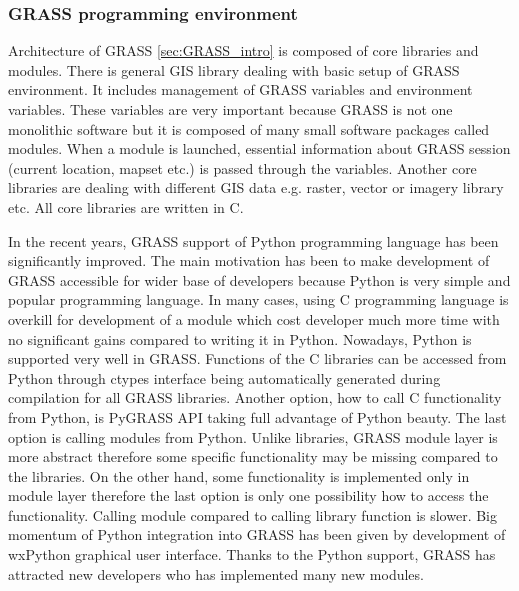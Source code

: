 \documentclass[a4paper,12pt]{article}
\begin{document}
\subsubsection{GRASS programming  environment}




Architecture of GRASS \ref{sec:GRASS_intro} is composed of core libraries and modules. There is general GIS library 
dealing with basic setup of GRASS environment. It includes management of
GRASS variables and environment variables. These variables are very important because GRASS is not one monolithic software 
but it is composed of many small software packages called modules. When a module is launched, essential information 
about GRASS session (current location, mapset etc.) is passed through the variables. 
Another core libraries are dealing with different GIS data e.g. raster, vector or imagery library etc. 
All core libraries are written in C. 

In the recent years, GRASS support of Python programming language has been significantly 
improved. The main motivation has been to make development of GRASS accessible for wider base
of developers because Python is very simple and popular programming language. 
In many cases, using 
C programming language is overkill for development of a module which cost developer much more time 
with no significant gains compared to writing it in Python. Nowadays, Python is supported very well in GRASS.
Functions of the C libraries can be accessed from Python through ctypes interface being automatically generated during compilation
for all GRASS libraries.  
Another option, how to call C functionality from Python, is 
PyGRASS API taking full advantage of Python beauty.
The last option is calling modules from Python. Unlike libraries, GRASS module layer is more abstract
therefore some specific functionality may be missing compared to the libraries. 
On the other hand, some functionality is implemented
only in module layer therefore the last option is only one possibility how to access the functionality.
Calling module compared to calling library function is slower.
Big momentum of Python integration into GRASS has been given by development of wxPython graphical
user interface. 
Thanks to the Python support, GRASS has attracted new developers who has implemented many new modules.
\end{document}
